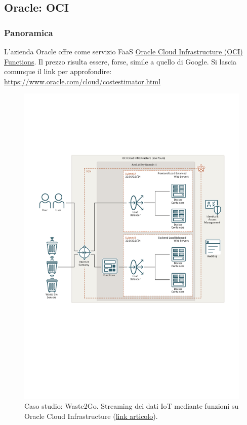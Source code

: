 \documentclass[a4paper]{article}
\begin{document}
	\subsection{Oracle: OCI}
	
	\subsubsection{Panoramica}
	
	L'azienda Oracle offre come servizio FaaS \href{https://www.oracle.com/cloud/cloud-native/functions/}{Oracle Cloud Infrastructure (OCI) Functions}. Il prezzo risulta essere, forse, simile a quello di Google. Si lascia comunque il link per approfondire: \url{https://www.oracle.com/cloud/costestimator.html}
	\begin{figure}[!htp]
		\centering
		\includegraphics[width=\textwidth]{img/Oracle-1.pdf}
		\caption{Caso studio: Waste2Go. Streaming dei dati IoT mediante funzioni su Oracle Cloud Infrastructure (\href{https://docs.oracle.com/it/solutions/waste-two-go-on-oci/index.html}{link articolo}).}
	\end{figure}\newpage
	
\end{document}
